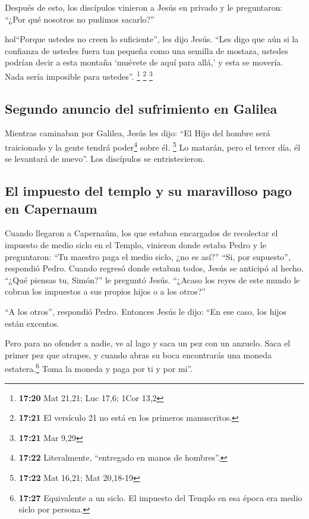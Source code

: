  Después de esto, los discípulos vinieron a Jesús en
privado y le preguntaron: ``¿Por qué nosotros no pudimos sacarlo?''

 hol``Porque ustedes no creen lo suficiente'', les dijo
Jesús. ``Les digo que aún si la confianza de ustedes fuera tan pequeña
como una semilla de mostaza, ustedes podrían decir a esta montaña
`muévete de aquí para allá,' y esta se movería. Nada sería imposible
para ustedes''. \footnote{\textbf{17:20} Mat 21,21; Luc 17,6; 1Cor 13,2}
 \footnote{\textbf{17:21} El versículo 21 no está en los
  primeros manuscritos.} \footnote{\textbf{17:21} Mar 9,29}

\hypertarget{segundo-anuncio-del-sufrimiento-en-galilea}{%
\subsection{Segundo anuncio del sufrimiento en
Galilea}\label{segundo-anuncio-del-sufrimiento-en-galilea}}

 Mientras caminaban por Galilea, Jesús les dijo: ``El
Hijo del hombre será traicionado y la gente tendrá poder\footnote{\textbf{17:22}
  Literalmente, ``entregado en manos de hombres''.} sobre él.
\footnote{\textbf{17:22} Mat 16,21; Mat 20,18-19}  Lo
matarán, pero el tercer día, él se levantará de nuevo''. Los discípulos
se entristecieron.

\hypertarget{el-impuesto-del-templo-y-su-maravilloso-pago-en-capernaum}{%
\subsection{El impuesto del templo y su maravilloso pago en
Capernaum}\label{el-impuesto-del-templo-y-su-maravilloso-pago-en-capernaum}}

 Cuando llegaron a Capernaúm, los que estaban encargados
de recolectar el impuesto de medio siclo en el Templo, vinieron donde
estaba Pedro y le preguntaron: ``Tu maestro paga el medio siclo, ¿no es
así?''  ``Si, por supuesto'', respondió Pedro. Cuando
regresó donde estaban todos, Jesús se anticipó al hecho. ``¿Qué piensas
tu, Simón?'' le preguntó Jesús. ``¿Acaso los reyes de este mundo le
cobran los impuestos a sus propios hijos o a los otros?''

 ``A los otros'', respondió Pedro. Entonces Jesús le
dijo: ``En ese caso, los hijos están excentos.

 Pero para no ofender a nadie, ve al lago y saca un pez
con un anzuelo. Saca el primer pez que atrapes, y cuando abras su boca
encontrarás una moneda estatera.\footnote{\textbf{17:27} Equivalente a
  un siclo. El impuesto del Templo en esa época era medio siclo por
  persona.} Toma la moneda y paga por ti y por mi''.

